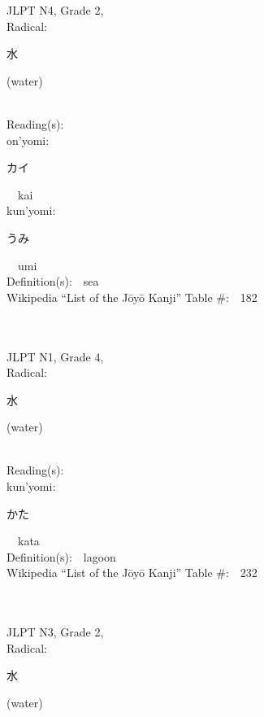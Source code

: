 \begin{multicols}{2}
{JLPT N4, Grade 2, \\Radical:\ \ {\begin{CJK}{UTF8}{min} 水 \end{CJK}} (water) } \\
Reading(s):\ \ \\
{\hspace*{1em}}on'yomi:\ \ \\
{\hspace*{2em}}{\begin{CJK}{UTF8}{min} カイ \end{CJK}}\ \ kai\ \ \\
{\hspace*{1em}}kun'yomi:\ \ \\
{\hspace*{2em}}{\begin{CJK}{UTF8}{min} うみ \end{CJK}}\ \ umi\ \ \\
Definition(s):\ \ sea \\
Wikipedia ``List of the J\=oy\=o Kanji'' Table \#:\ \ 182 \\
\ \ \\
{\fontsize{34pt}{40pt}  }\ \ \\  %
{JLPT N1, Grade 4, \\Radical:\ \ {\begin{CJK}{UTF8}{min} 水 \end{CJK}} (water) } \\
Reading(s):\ \ \\
{\hspace*{1em}}kun'yomi:\ \ \\
{\hspace*{2em}}{\begin{CJK}{UTF8}{min} かた \end{CJK}}\ \ kata\ \ \\
Definition(s):\ \ lagoon \\
Wikipedia ``List of the J\=oy\=o Kanji'' Table \#:\ \ 232 \\
\ \ \\
{\fontsize{34pt}{40pt}  }\ \ \\  %
{JLPT N3, Grade 2, \\Radical:\ \ {\begin{CJK}{UTF8}{min} 水 \end{CJK}} (water) } \\

\end{multicols}
